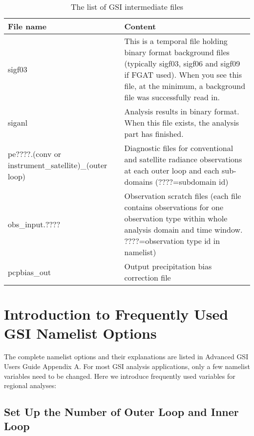 \begin{table}[htbp]
\centering
\caption{The list of GSI intermediate files}
\begin{tabular}{|p{5cm}|p{10cm}|}
\hline
\hline
File name &	Content \\
\hline
sigf03 & This is a temporal file holding binary format background files (typically sigf03, sigf06 and sigf09 if FGAT used). When you see this file, at the minimum, a background file was successfully read in.\\
\hline
siganl & Analysis results in binary format. When this file exists, the analysis part has finished.\\
\hline
pe????.(conv or instrument\_satellite)\_(outer loop) &	Diagnostic files for conventional and satellite radiance observations at each outer loop and each sub-domains (????=subdomain id)\\
\hline
obs\_input.???? & Observation scratch files (each file contains observations for one observation type within whole analysis domain and time window. ????=observation type id in namelist)\\
\hline
pcpbias\_out &	Output precipitation bias correction file\\
\hline
\end{tabular}
\label{t37}
\end{table} 



\section{Introduction to Frequently Used GSI Namelist Options}

The complete namelist options and their explanations are listed in Advanced GSI User\textquotesingle s Guide Appendix A. For most GSI analysis applications, only a few namelist variables need to be changed. Here we introduce frequently used variables for regional analyses: 

\subsection{Set Up the Number of Outer Loop and Inner Loop}

